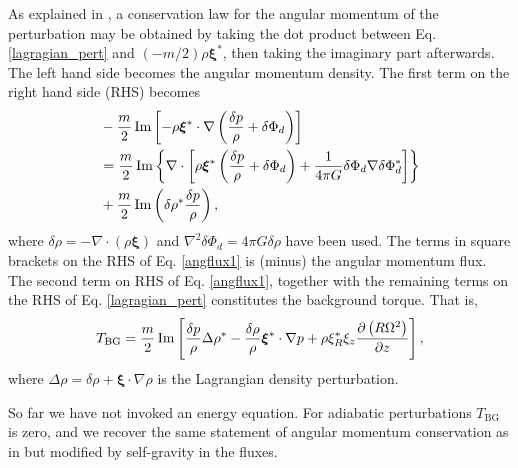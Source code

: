 As explained in \cite{lin11b}, a conservation law for the angular
momentum of the perturbation may be obtained by taking the dot product
between Eq. \ref{lagragian_pert} and $(-m/2)\rho\bm{\xi}^*$, then
taking the imaginary part afterwards. The left hand side becomes the
angular momentum density. The first term on the right hand side (RHS)
becomes 
\begin{align}\label{angflux1}
  &-\frac{m}{2}\operatorname{Im}\left[-\rho\bm{\xi}^*\cdot\nabla\left(\frac{\delta p}{\rho} + \delta
    \Phi_d\right)\right] \notag\\ 
&= \frac{m}{2}\operatorname{Im}\left\{\nabla\cdot\left[\rho\bm{\xi}^*\left(\frac{\delta p}{\rho} + \delta
    \Phi_d \right) + \frac{1}{4\pi
    G}\delta\Phi_d\nabla\delta\Phi_d^*\right]\right\} \notag\\
&+ \frac{m}{2}\operatorname{Im}\left(\delta\rho^*\frac{\delta p}{\rho}\right),
\end{align}
where $\delta\rho = - \nabla\cdot\left(\rho\bm{\xi}\right)$ and
$\nabla^2\delta\Phi_d = 4\pi G \delta \rho$ have been used. The 
terms in square brackets on the RHS of Eq. \ref{angflux1} is (minus) the 
angular momentum flux. The second term on RHS of Eq. \ref{angflux1}, 
together with the remaining terms on the RHS of 
Eq. \ref{lagragian_pert} constitutes the background torque. That is, 
\begin{align}\label{tbg_3d}
  T_\mathrm{BG} = \frac{m}{2}\operatorname{Im}\left[
    \frac{\delta p}{\rho} \Delta\rho^* -
    \frac{\delta\rho}{\rho}\bm{\xi}^*\cdot\nabla p  
    + \rho \xi_R^*\xi_z\frac{\partial\left(R\Omega^2\right)}{\partial z}\right],
\end{align}
where $\Delta\rho = \delta\rho + \bm{\xi}\cdot\nabla\rho$ is the
Lagrangian density perturbation. 

So far we have not invoked an energy equation. For 
adiabatic perturbations $T_\mathrm{BG}$ is zero, and we recover the
same statement of angular momentum conservation as in \cite{lin93b} but 
modified by self-gravity in the fluxes. 

